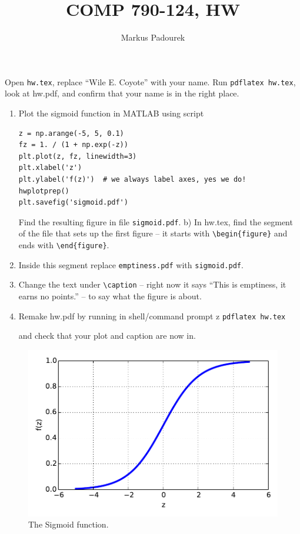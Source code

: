 \documentclass{article}
\begin{document}
\lstset{language=Python}
\lstset{basicstyle=\ttfamily}
\lstset{tabsize=4}
\lstset{columns=fullflexible}

\author{Markus Padourek}
\title{COMP  790-124, HW\theHW}
\maketitle



\newproblem{0.01pt} Open \texttt{hw\theHW.tex}, replace ``Wile E. Coyote'' with your name. Run
\texttt{pdflatex hw\theHW.tex}, look at hw\theHW.pdf, and confirm that your name is in the right place.


\newproblem{1pt}
\begin{enumerate}
\item Plot the sigmoid function in MATLAB using script
\begin{verbatim}
z = np.arange(-5, 5, 0.1)
fz = 1. / (1 + np.exp(-z))
plt.plot(z, fz, linewidth=3)
plt.xlabel('z')
plt.ylabel('f(z)')  # we always label axes, yes we do!
hwplotprep()
plt.savefig('sigmoid.pdf')
\end{verbatim}
Find the resulting figure in file {\tt sigmoid.pdf}.
b) In hw\theHW.tex, find the segment of the file that sets up the first figure -- it starts with {\tt \textbackslash begin\{figure\}} and ends with  {\tt \textbackslash end\{figure\}}.
\item Inside this segment  replace {\tt emptiness.pdf} with {\tt sigmoid.pdf}.
\item Change the text under {\tt \textbackslash caption} -- right now it says ``This is emptiness, it earns no points.'' -- to say what the figure is about.
\item Remake hw\theHW.pdf by running in shell/command prompt
z
     \texttt{pdflatex hw\theHW.tex}

and check that your plot and caption are now in.
\end{enumerate}


\begin{figure}[H]
\begin{center}
\includegraphics[scale=0.5]{sigmoid.pdf}
\caption{The Sigmoid function.}
\end{center}
\end{figure}
\end{document}
